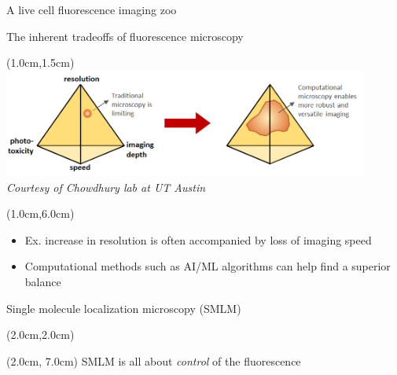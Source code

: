 \documentclass{beamer}					%
\begin{document}
\begin{frame}{A live cell fluorescence imaging zoo}

\end{frame}

\begin{frame}{The inherent tradeoffs of fluorescence microscopy}
\begin{textblock*}{12cm}(1.0cm,1.5cm)
\includegraphics[width=12cm]{../../postdoc/sartorius/media/Tradeoff.png}
\emph{Courtesy of Chowdhury lab at UT Austin}
\end{textblock*}
\begin{textblock*}{12cm}(1.0cm,6.0cm)
\begin{itemize}
\item Ex. increase in resolution is often accompanied by loss of imaging speed
\item Computational methods such as AI/ML algorithms can help find a superior balance
\end{itemize}
\end{textblock*}
\end{frame}


\begin{frame}{Single molecule localization microscopy (SMLM)}

\begin{textblock*}{10cm}(2.0cm,2.0cm)
\end{textblock*}

\begin{textblock*}{10cm}(2.0cm, 7.0cm)
SMLM is all about \emph{control} of the fluorescence 
\end{textblock*}

\end{frame}
\end{document}
